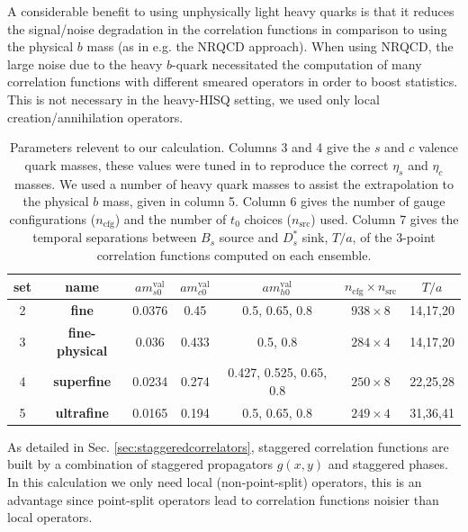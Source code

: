 A considerable benefit to using unphysically light heavy quarks is that it reduces the signal/noise degradation in the correlation functions in comparison to using the physical $b$ mass (as in e.g. the NRQCD approach). When using NRQCD, the large noise due to the heavy $b$-quark necessitated the computation of many correlation functions with different smeared operators in order to boost statistics. This is not necessary in the heavy-HISQ setting, we used only local creation/annihilation operators.

\begin{table}
  \begin{center}
    \begin{tabular}{c c c c c c c}
      \hline
      set & name & $am_{s0}^{\text{val}}$ & $am_{c0}^{\text{val}}$ & $am^{\text{val}}_{h0}$ & $n_{\text{cfg}}\times n_{\text{src}}$ & $T/a$ \\ [0.5ex]
      \hline
      2 & \bf{fine} & 0.0376 & 0.45 
      & 0.5, 0.65, 0.8 & $938\times 8$ & 14,17,20 \\ [1ex]
      3 & \bf{fine-physical} & 0.036 & 0.433 
      & 0.5, 0.8 & $284\times 4$ & 14,17,20 \\ [1ex]
      4 & \bf{superfine} & 0.0234 & 
      0.274 & 0.427, 0.525, 0.65, 0.8 & $250\times 8$ & 22,25,28  \\ [1ex]
      5 & \bf{ultrafine} & 0.0165 
      & 0.194 & 0.5, 0.65, 0.8 & $249\times 4$ & 31,36,41\\ [1ex]
      \hline
    \end{tabular}
  \end{center}
  \caption{Parameters relevent to our calculation. Columns 3 and 4 give the $s$ and $c$ valence quark masses, these values were tuned in \cite{Chakraborty:2014aca} to reproduce the correct $\eta_s$ and $\eta_c$ masses. We used a number of heavy quark masses to assist the extrapolation to the physical $b$ mass, given in column 5. Column 6 gives the number of gauge configurations ($n_{\text{cfg}}$) and the number of $t_0$ choices ($n_{\text{src}}$) used. Column 7 gives the temporal separations between $B_s$ source and $D_s^*$ sink, $T/a$, of the 3-point correlation functions computed on each ensemble.}
  \label{tab:BsDsensembles}
\end{table}

As detailed in Sec. \ref{sec:staggeredcorrelators}, staggered correlation functions are built by a combination of staggered propagators $g(x,y)$ and staggered phases. In this calculation we only need local (non-point-split) operators, this is an advantage since point-split operators lead to correlation functions noisier than local operators. 

